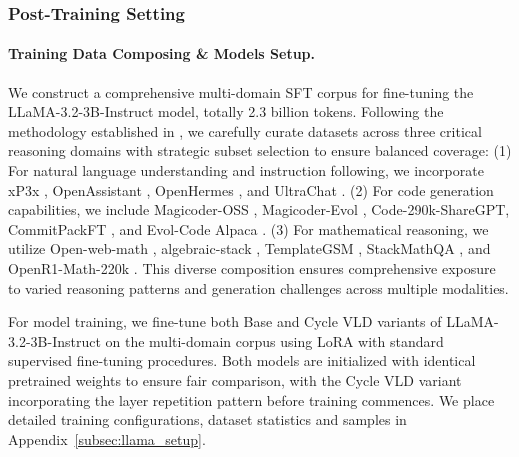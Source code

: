 \documentclass{article} %
\begin{document}
\subsubsection{Post-Training Setting}

\paragraph{Training Data Composing \& Models Setup.} 
We construct a comprehensive multi-domain SFT corpus for fine-tuning the LLaMA-3.2-3B-Instruct model, totally 2.3 billion tokens. Following the methodology established in \citet{shen2024jetmoe}, we carefully curate datasets across three critical reasoning domains with strategic subset selection to ensure balanced coverage: (1) For natural language understanding and instruction following, we incorporate xP3x \citep{muennighoff2022crosslingual}, OpenAssistant \citep{kopf2024openassistant} , OpenHermes \citep{teknium2023openhermes} , and UltraChat \citep{ding2023enhancing}. (2) For code generation capabilities, we include Magicoder-OSS \citep{wei2023magicoder} , Magicoder-Evol \citep{wei2023magicoder} , Code-290k-ShareGPT, CommitPackFT \citep{muennighoff2023octopack}, and Evol-Code Alpaca \citep{luo2023wizardcoder} . (3) For mathematical reasoning, we utilize Open-web-math \citep{paster2023openwebmath} , algebraic-stack \citep{azerbayev2023llemma} , TemplateGSM \citep{fu2023specializing} , StackMathQA \citep{zhang2024stackmathqa} , and OpenR1-Math-220k \citep{openr1math220k}. This diverse composition ensures comprehensive exposure to varied reasoning patterns and generation challenges across multiple modalities.

For model training, we fine-tune both Base and Cycle VLD variants of LLaMA-3.2-3B-Instruct on the multi-domain corpus using LoRA\citep{hu2022lora} with standard supervised fine-tuning procedures. Both models are initialized with identical pretrained weights to ensure fair comparison, with the Cycle VLD variant incorporating the layer repetition pattern before training commences. We place detailed training configurations, dataset statistics and samples in Appendix~\ref{subsec:llama_setup}.
\end{document}
